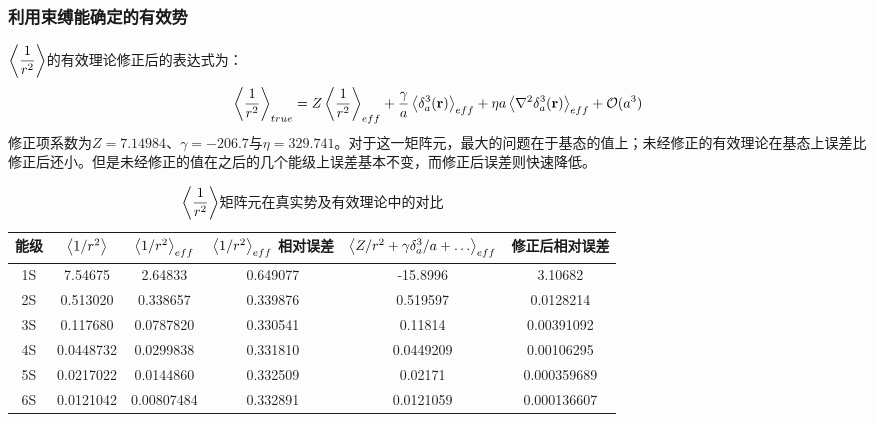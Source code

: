 \documentclass[hyperref,cs4size,titlepage,twoside]{ctexart}
\begin{document}
\subsubsection{利用束缚能确定的有效势}
$\displaystyle\expval{\frac{1}{r^2}}$的有效理论修正后的表达式为：
\begin{equation}\label{r2true}
  \expval{\frac{1}{r^2}}_{true}=Z\expval{\frac{1}{r^2}}_{eff}+\frac{\gamma}{a}\expval{\delta^3_a(\vb{r})}_{eff}+\eta a\expval{\laplacian{\delta^3_a(\vb{r})}}_{eff}+\mathcal{O}(a^3)
\end{equation}
修正项系数为$Z=7.14984$、$\gamma=-206.7$与$\eta=329.741$。对于这一矩阵元，最大的问题在于基态的值上；未经修正的有效理论在基态上误差比修正后还小。但是未经修正的值在之后的几个能级上误差基本不变，而修正后误差则快速降低。
\begin{table}[!hbtp]
  \centering
  \begin{tabular}{|cccccc|}
    \hline
    能级 & $\expval{1/r^2}$ & $\expval{1/r^2}_{eff}$ & $\expval{1/r^2}_{eff}$ 相对误差& $\expval{Z/r^2+\gamma \delta^3_a/a+\dots}_{eff}$ & 修正后相对误差 \\
    \hline
    1S & 7.54675 & 2.64833 &0.649077& -15.8996&3.10682 \\
    2S & 0.513020 & 0.338657 &0.339876& 0.519597&0.0128214 \\
    3S & 0.117680 & 0.0787820 &0.330541& 0.11814&0.00391092 \\
    4S & 0.0448732 & 0.0299838 &0.331810& 0.0449209&0.00106295 \\
    5S & 0.0217022 & 0.0144860 &0.332509& 0.02171&0.000359689 \\
    6S & 0.0121042 & 0.00807484 &0.332891& 0.0121059&0.000136607 \\
    \hline
  \end{tabular}
  \caption{$\displaystyle\expval{\frac{1}{r^2}}$矩阵元在真实势及有效理论中的对比}\label{evr2}
\end{table}
\end{document}

